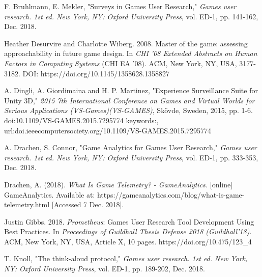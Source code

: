 \documentclass[journal]{IEEEtran}
\begin{document}

%
%
%
\begin{thebibliography}{17}

F. Bruhlmann, E. Mekler, "Surveys in Games User Research," \emph{Games user research. 1st ed. New York, NY: Oxford University Press}, vol. ED-1, pp. 141-162, Dec. 2018.

Heather Desurvire and Charlotte Wiberg. 2008. Master of the game: assessing approachability in future game design. In \emph{CHI '08 Extended Abstracts on Human Factors in Computing Systems} (CHI EA '08). ACM, New York, NY, USA, 3177-3182. DOI: https://doi.org/10.1145/1358628.1358827

A. Dingli, A. Giordimaina and H. P. Martinez, "Experience Surveillance Suite for Unity 3D," \emph{2015 7th International Conference on Games and Virtual Worlds for Serious Applications (VS-Games)(VS-GAMES)}, Skövde, Sweden, 2015, pp. 1-6.
doi:10.1109/VS-GAMES.2015.7295774 keywords:{}, url:doi.ieeecomputersociety.org/10.1109/VS-GAMES.2015.7295774

A. Drachen, S. Connor, "Game Analytics for Games User Research," \emph{Games user research. 1st ed. New York, NY: Oxford University Press}, vol. ED-1, pp. 333-353, Dec. 2018.

Drachen, A. (2018). \emph{What Is Game Telemetry? - GameAnalytics.} [online] GameAnalytics. Available at: https://gameanalytics.com/blog/what-is-game-telemetry.html [Accessed 7 Dec. 2018].

Justin Gibbs. 2018. \emph{Prometheus}: Games User Research Tool Development Using Best Practices. In \emph{Proceedings of Guildhall Thesis Defense 2018 (Guildhall’18)}. ACM, New York, NY, USA, Article X, 10 pages. https://doi.org/10.475/123\_4

T. Knoll, "The think-aloud protocol," \emph{Games user research. 1st ed. New York, NY: Oxford University Press}, vol. ED-1, pp. 189-202, Dec. 2018.


\end{thebibliography}
\end{document}
